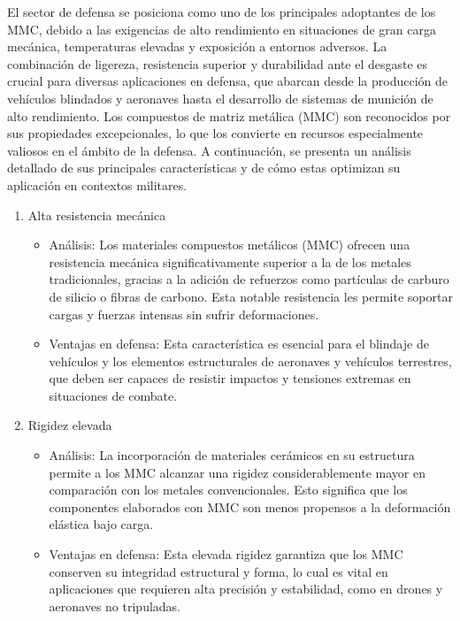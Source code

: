\documentclass[letterpaper, 12pt]{article}
\begin{document}
El sector de defensa se posiciona como uno de los principales adoptantes de los
MMC, debido a las exigencias de alto rendimiento en situaciones de gran carga
mecánica, temperaturas elevadas y exposición a entornos adversos. La
combinación de ligereza, resistencia superior y durabilidad ante el desgaste es
crucial para diversas aplicaciones en defensa, que abarcan desde la producción
de vehículos blindados y aeronaves hasta el desarrollo de sistemas de munición
de alto rendimiento. Los compuestos de matriz metálica (MMC) son reconocidos
por sus propiedades excepcionales, lo que los convierte en recursos
especialmente valiosos en el ámbito de la defensa. A continuación, se presenta
un análisis detallado de sus principales características y de cómo estas
optimizan su aplicación en contextos militares.

\begin{enumerate}
      \item Alta resistencia mecánica
            \begin{itemize}
                  \item Análisis: Los materiales compuestos metálicos (MMC) ofrecen una resistencia
                        mecánica significativamente superior a la de los metales tradicionales, gracias
                        a la adición de refuerzos como partículas de carburo de silicio o fibras de
                        carbono. Esta notable resistencia les permite soportar cargas y fuerzas
                        intensas sin sufrir deformaciones.

                  \item Ventajas en defensa: Esta característica es esencial para el blindaje de
                        vehículos y los elementos estructurales de aeronaves y vehículos terrestres,
                        que deben ser capaces de resistir impactos y tensiones extremas en situaciones
                        de combate.
            \end{itemize}
      \item Rigidez elevada
            \begin{itemize}
                  \item Análisis: La incorporación de materiales cerámicos en su estructura permite a
                        los MMC alcanzar una rigidez considerablemente mayor en comparación con los
                        metales convencionales. Esto significa que los componentes elaborados con MMC
                        son menos propensos a la deformación elástica bajo carga.
                  \item Ventajas en defensa: Esta elevada rigidez garantiza que los MMC conserven su
                        integridad estructural y forma, lo cual es vital en aplicaciones que requieren
                        alta precisión y estabilidad, como en drones y aeronaves no tripuladas.
            \end{itemize}


\end{enumerate}
\end{document}
